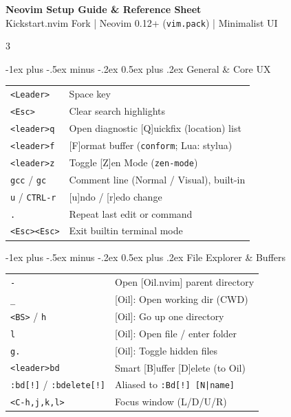 \documentclass[11pt,landscape]{article}
\makeatletter
\renewcommand{\section}{\@startsection{section}{1}{0mm}%
                                {-1ex plus -.5ex minus -.2ex}%
                                {0.5ex plus .2ex}%
                                {\normalfont\large\bfseries\color{myblue}}}
\makeatother
\begin{document}
\raggedright
\footnotesize
\begin{center}
     \Large{\textbf{Neovim Setup Guide \& Reference Sheet}} \\
     \small{\textcolor{mygrey}{Kickstart.nvim Fork | Neovim 0.12+ (\texttt{vim.pack}) | Minimalist UI}}
\end{center}

\setlength{\premulticols}{1pt}
\setlength{\postmulticols}{1pt}
\setlength{\multicolsep}{1pt}
\setlength{\columnsep}{6pt}

\begin{multicols}{3}

\section{General \& Core UX}
\begin{tabular}{@{}ll@{}}
\texttt{<Leader>} & Space key \\
\texttt{<Esc>} & Clear search highlights \\
\texttt{<leader>q} & Open diagnostic [Q]uickfix (location) list \\
\texttt{<leader>f} & [F]ormat buffer (\texttt{conform}; Lua: stylua) \\
\texttt{<leader>z} & Toggle [Z]en Mode (\texttt{zen-mode}) \\
\texttt{gcc} / \texttt{gc} & Comment line (Normal / Visual), built-in \\
\texttt{u} / \texttt{CTRL-r} & [u]ndo / [r]edo change \\
\texttt{.} & Repeat last edit or command \\
\texttt{<Esc><Esc>} & Exit builtin terminal mode \\
\end{tabular}

\section{File Explorer \& Buffers}
\begin{tabular}{@{}ll@{}}
\texttt{-} & Open [Oil.nvim] parent directory \\
\texttt{\_} & [Oil]: Open working dir (CWD) \\
\texttt{<BS>} / \texttt{h} & [Oil]: Go up one directory \\
\texttt{l} & [Oil]: Open file / enter folder \\
\texttt{g.} & [Oil]: Toggle hidden files \\
\texttt{<leader>bd} & Smart [B]uffer [D]elete (to Oil) \\
\texttt{:bd[!]} / \texttt{:bdelete[!]} & Aliased to \texttt{:Bd[!] [N|name]} \\
\texttt{<C-h,j,k,l>} & Focus window (L/D/U/R) \\
\end{tabular}


\end{multicols}
\end{document}
